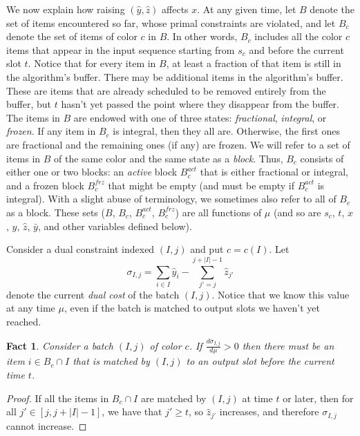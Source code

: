 \documentclass[12pt]{article}
\newtheorem{fact}[theorem]{Fact}
\begin{document}
We now explain how raising $(\hat{y},\hat{z})$ affects
$x$. At any given time, let $B$ denote the set of
items encountered so far, whose primal constraints are
violated, and let $B_c$ denote the set of items of color
$c$ in $B$. In other words, $B_c$ includes all the color
$c$ items that appear in the input sequence starting from
$s_c$ and before the current slot $t$.
Notice that for every item in $B$, at least a
fraction of that item is still in the algorithm's buffer.
There may be additional items in the algorithm's buffer.
These are items that are already scheduled to be removed
entirely from the buffer, but $t$ hasn't yet passed
the point where they disappear from the buffer. The items
in $B$ are endowed with one of three states: {\em fractional},
{\em integral}, or {\em frozen}. If any item in $B_c$ is integral,
then they all are. Otherwise, the first ones are fractional and the 
remaining ones (if any) are frozen. We
will refer to a set of items in $B$ of the same color and the same
state as a {\em block}. Thus, $B_c$ consists of either one or two
blocks: an {\em active} block $B_c^{act}$ that is either fractional
or integral, and a frozen block $B_c^{frz}$ that might be empty
(and must be empty if $B_c^{act}$ is integral). With a slight abuse
of terminology, we sometimes also refer to all of $B_c$ as a block.
These sets ($B$, $B_c$, $B_c^{act}$, $B_c^{frz}$) are all functions 
of $\mu$ (and so are $s_c$, $t$, $x$, $\hat{y}$, $\hat{z}$, $\bar{y}$, 
and other variables defined below).

Consider a dual constraint indexed $(I,j)$ and put $c = c(I)$. Let
$$
\sigma_{I,j} = \sum_{i\in I} \hat{y}_{i}-\sum_{j'=j}^{j+|I|-1} \hat{z}_{j'}
$$
denote the current {\em dual cost} of the batch $(I,j)$. Notice that we 
know this value at any time $\mu$, even if the batch is matched to 
output slots we haven't yet reached.
\begin{fact}
Consider a batch $(I,j)$ of color $c$. If
$\frac{d\sigma_{I,j}}{d\mu} > 0$ then there must be an item
$i\in B_c\cap I$ that is matched by $(I,j)$ to an output
slot before the current time $t$.
\end{fact}

\begin{proof}
If all the items in $B_c\cap I$ are matched by $(I,j)$ at time $t$
or later, then for all $j'\in [j,j+|I|-1]$, we have that $j'\ge t$,
so $\hat{z}_{j'}$ increases, and therefore $\sigma_{I,j}$ cannot 
increase.
\end{proof}
\end{document}
